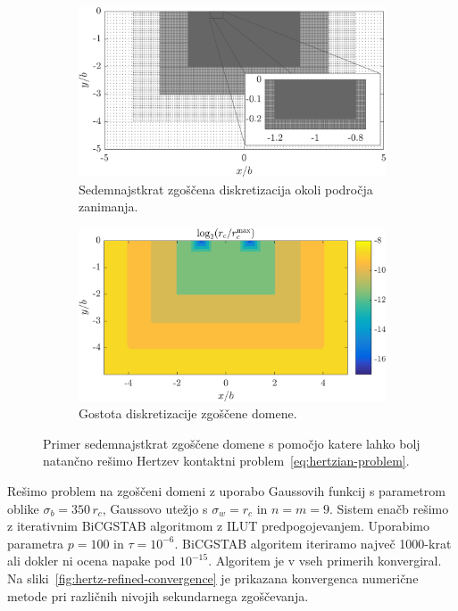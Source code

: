 \documentclass[12pt,a4paper,twoside]{article}
\theoremstyle{definition} %
\theoremstyle{plain} %
\numberwithin{equation}{section}
\begin{document}
\begin{figure}[h]
  \centering
  \begin{subfigure}[t]{0.45\textwidth}
    \includegraphics[width=\textwidth]{images/hertzian_refined_domain.png}
    \caption[Sedemnajstkrat zgoščena diskretizacija.]{Sedemnajstkrat zgoščena diskretizacija okoli področja zanimanja.}
    \label{fig:hertz-refined-domain}
  \end{subfigure}
  \begin{subfigure}[t]{0.45\textwidth}
    \includegraphics[width=\textwidth]{images/hertzian_refined_domain_density.png}
    \caption{Gostota diskretizacije zgoščene domene.}
    \label{fig:hertz-refined-domain-density}
  \end{subfigure}
  \caption[Primer zgoščene domene s katero rešujemo Hertzev kontaktni
  problem.]{Primer sedemnajstkrat zgoščene domene s pomočjo katere lahko
  bolj natančno rešimo Hertzev kontaktni problem~\eqref{eq:hertzian-problem}.}
  \label{fig:hertz-refined-domain-together}
\end{figure}

Rešimo problem na zgoščeni domeni z uporabo Gaussovih funkcij s parametrom oblike $\sigma_b = 350\,
r_c$, Gaussovo utežjo s $\sigma_w = r_c$ in $n = m = 9$. Sistem enačb rešimo z iterativnim
BiCGSTAB algoritmom z ILUT predpogojevanjem. Uporabimo parametra $p=100$ in $\tau = 10^{-6}$.
BiCGSTAB algoritem iteriramo največ 1000-krat ali dokler ni ocena napake pod $10^{-15}$.
Algoritem je v vseh primerih konvergiral. Na sliki~\ref{fig:hertz-refined-convergence} je prikazana
konvergenca numerične metode pri različnih nivojih sekundarnega zgoščevanja.
\end{document}
